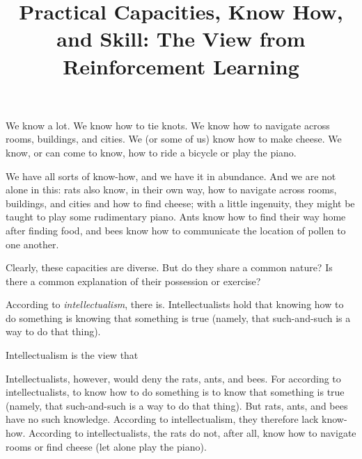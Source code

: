 \documentclass{diss}
\title{Practical Capacities, Know How, and Skill: The View from Reinforcement Learning}
\begin{document}
\maketitle

We know a lot. 
We know how to tie knots.
We know how to navigate across rooms, buildings, and cities.
We (or some of us) know how to make cheese.
We know, or can come to know, how to ride a bicycle or play the piano.

We have all sorts of know-how, and we have it in abundance.
And we are not alone in this: rats also know, in their own way, how to navigate across rooms, buildings, and cities and how to find cheese; with a little ingenuity, they might be taught to play some rudimentary piano.
Ants know how to find their way home after finding food, and bees know how to communicate the location of pollen to one another.

Clearly, these capacities are diverse.
But do they share a common nature?
Is there a common explanation of their possession or exercise?

According to \emph{intellectualism}, there is.
Intellectualists hold that knowing how to do something is knowing that something is true (namely, that such-and-such is a way to do that thing).

Intellectualism is the view that 

Intellectualists, however, would deny the rats, ants, and bees.
For according to intellectualists, to know how to do something is to know that something is true (namely, that such-and-such is a way to do that thing).
But rats, ants, and bees have no such knowledge.
According to intellectualism, they therefore lack know-how.
According to intellectualists, the rats do not, after all, know how to navigate rooms or find cheese (let alone play the piano).






\end{document}
